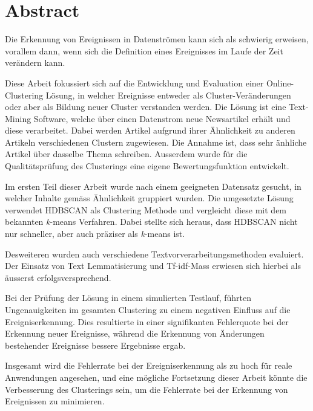 
\section*{Abstract}

Die Erkennung von Ereignissen in Datenströmen kann sich als schwierig erweisen, vorallem dann,
wenn sich die Definition eines Ereignisses im Laufe der Zeit verändern kann.

Diese Arbeit fokussiert sich auf die Entwicklung und Evaluation einer Online-Clustering Lösung,
in welcher Ereignisse entweder als Cluster-Veränderungen oder aber als Bildung neuer Cluster
verstanden werden.
Die Lösung ist eine Text-Mining Software, welche über einen Datenstrom neue Newsartikel erhält
und diese verarbeitet.
Dabei werden Artikel aufgrund ihrer Ähnlichkeit zu anderen Artikeln verschiedenen Clustern zugewiesen.
Die Annahme ist, dass sehr änhliche Artikel über dasselbe Thema schreiben.
Ausserdem wurde für die Qualitätsprüfung des Clusterings eine eigene Bewertungsfunktion entwickelt.

Im ersten Teil dieser Arbeit wurde nach einem geeigneten Datensatz gesucht,
in welcher Inhalte gemäss Ähnlichkeit gruppiert wurden.
Die umgesetzte Lösung verwendet HDBSCAN als Clustering Methode und vergleicht diese mit
dem bekannten \textit{k}-means Verfahren.
Dabei stellte sich heraus, dass HDBSCAN nicht nur schneller, aber auch präziser als \textit{k}-means ist.

Desweiteren wurden auch verschiedene Textvorverarbeitungsmethoden evaluiert.
Der Einsatz von Text Lemmatisierung und Tf-idf-Mass erwiesen sich hierbei als äusserst erfolgsversprechend.

Bei der Prüfung der Lösung in einem simulierten Testlauf, führten Ungenauigkeiten im gesamten Clustering
zu einem negativen Einfluss auf die Ereigniserkennung.
Dies resultierte in einer signifikanten Fehlerquote bei der Erkennung neuer Ereignisse,
während die Erkennung von Änderungen bestehender Ereignisse bessere Ergebnisse ergab.

Insgesamt wird die Fehlerrate bei der Ereigniserkennung als zu hoch für reale Anwendungen angesehen,
und eine mögliche Fortsetzung dieser Arbeit könnte die Verbesserung des Clusterings sein,
um die Fehlerrate bei der Erkennung von Ereignissen zu minimieren.
